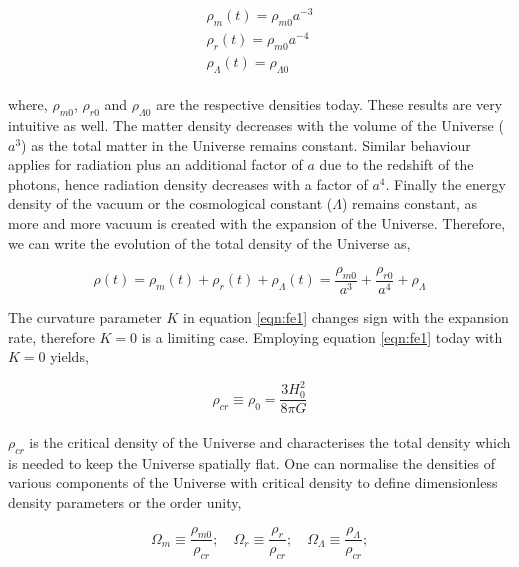 \begin{equation}
\begin{array}{l}
\rho_m(t) = \rho_{m0} a^{-3} \\
\rho_r(t) = \rho_{m0} a^{-4} \\
\rho_{\Lambda}(t) = \rho_{\Lambda 0}

\end{array} 
\label{eq:xdef}
\end{equation}
\\ 
where, $\rho_{m0}$, $\rho_{r0}$ and $\rho_{\Lambda 0}$ are the respective densities
today. These results are very intuitive as well. The matter density decreases with the volume 
of the Universe ($a^3$) as the total matter in the Universe remains constant. Similar
behaviour applies for radiation plus an additional factor of $a$ due to the redshift
of the photons, hence radiation density decreases with a factor of $a^4$. Finally the
energy density of the vacuum or the cosmological constant ($\Lambda$) remains constant, 
as more and more vacuum is created with the expansion of the Universe. Therefore,
we can write the evolution of the total density of the Universe as,

\begin{equation}
	\rho(t) = \rho_m(t)+\rho_r(t)+\rho_{\Lambda}(t) = \dfrac{\rho_{m0}}{a^3} + 
				\dfrac{\rho_{r0}}{a^4} + \rho_{\Lambda}
	\label{eqn:dens}
\end{equation}



The curvature parameter $K$ in equation \ref{eqn:fe1} changes sign with the expansion 
rate, therefore $K=0$ is a limiting case. Employing equation \ref{eqn:fe1} today with
$K=0$ yields,

\begin{equation}
	\rho_{cr} \equiv \rho_0 = \dfrac{3H_0^2}{8\pi G}
\end{equation}
\\
$\rho_{cr}$ is the critical density of the Universe and characterises the total density
which is needed to keep the Universe spatially flat. One can normalise the densities of
various components of the Universe with critical density to define dimensionless density
parameters or the order unity,

\begin{equation}
	\Omega_m \equiv \dfrac{\rho_{m0}}{\rho_{cr}};\quad
	\Omega_r \equiv \dfrac{\rho_{r}}{\rho_{cr}};\quad
	\Omega_{\Lambda} \equiv \dfrac{\rho_{\Lambda}}{\rho_{cr}};
	\label{eqn:Omega}
\end{equation}

